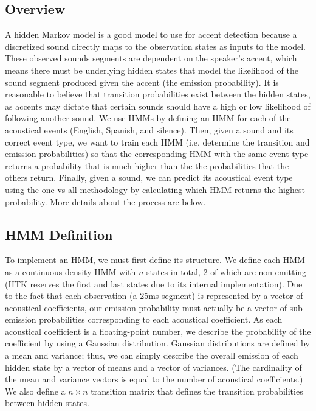\documentclass{wileySev}
\begin{document}
\subsection{Overview}
A hidden Markov model is a good model to use for accent detection because a discretized sound directly maps to the observation states as inputs to the model. These observed sounds segments are dependent on the speaker's accent, which means there must be underlying hidden states that model the likelihood of the sound segment produced given the accent (the emission probability). It is reasonable to believe that transition probabilities exist between the hidden states, as accents may dictate that certain sounds should have a high or low likelihood of following another sound. We use HMMs by defining an HMM for each of the acoustical events (English, Spanish, and silence). Then, given a sound and its correct event type, we want to train each HMM (i.e. determine the transition and emission probabilities) so that the corresponding HMM with the same event type returns a probability that is much higher than the the probabilities that the others return. Finally, given a sound, we can predict its acoustical event type using the one-vs-all methodology by calculating which HMM returns the highest probability. More details about the process are below.

\subsection{HMM Definition}
To implement an HMM, we must first define its structure. We define each HMM as a continuous density HMM with $n$ states in total, 2 of which are non-emitting (HTK reserves the first and last states due to its internal implementation). Due to the fact that each observation (a 25ms segment) is represented by a vector of acoustical coefficients, our emission probability must actually be a vector of sub-emission probabilities corresponding to each acoustical coefficient. As each acoustical coefficient is a floating-point number, we describe the probability of the coefficient by using a Gaussian distribution. Gaussian distributions are defined by a mean and variance; thus, we can simply describe the overall emission of each hidden state by a vector of means and a vector of variances. (The cardinality of the mean and variance vectors is equal to the number of acoustical coefficients.) We also define a $n\times n$ transition matrix that defines the transition probabilities between hidden states. 
\end{document}
